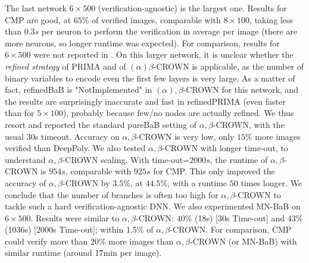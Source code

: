 The last network $6 \times 500$ (verification-agnostic) is the largest one. 
Results for CMP are good, at $65\%$ of verified images, comparable with $8\times 100$, taking less than $0.3s$ per neuron to perform the verification in average per image (there are more neurons, so longer runtime was expected). For comparison, results for $6 \times 500$ were not reported in \cite{crown,prima}. On this larger network, it is unclear whether the {\em refined strategy} of PRIMA and of $(\alpha)\beta$-CROWN is applicable, as the number of binary variables to encode even the first few layers is very large. As a matter of fact, refinedBaB is "NotImplemented" in $(\alpha),\beta$-CROWN for this network, and the results are surprisingly inaccurate and fast in refinedPRIMA (even faster than for $5 \times 100$), probably because few/no nodes are actually refined. We thus resort and reported the standard pureBaB setting of $\alpha,\beta$-CROWN, with the usual 30s timeout. Accuracy on $\alpha,\beta$-CROWN is very low, only $15\%$ more images verified than DeepPoly. 
We also tested $\alpha,\beta$-CROWN with longer time-out, to understand $\alpha,\beta$-CROWN scaling. With time-out=$2000s$, the runtime of $\alpha,\beta$-CROWN is $954s$, comparable with $925s$ for CMP. This only improved the accuracy of $\alpha,\beta$-CROWN by $3.5\%$, at $44.5\%$, with a runtime $50$ times longer. We conclude that the number of branches is often too high for $\alpha,\beta$-CROWN to tackle such a hard verification-agnostic DNN. We also experimented MN-BaB \cite{ferrari2022complete} on $6 \times 500$. Results were similar to $\alpha,\beta$-CROWN: $40\%$ (18s) [30s Time-out] and $43\%$ (1036s) [2000s Time-out]; within 1.5\% of $\alpha,\beta$-CROWN. For comparison, CMP could verify more than $20\%$ more images than $\alpha,\beta$-CROWN (or MN-BaB) with similar runtime (around 17min per image).




